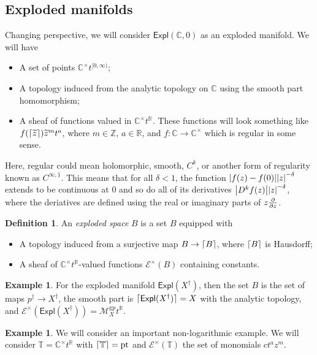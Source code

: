 \documentclass[leqno, openany]{memoir}
\DeclarePairedDelimiter{\ceil}{\lceil}{\rceil}
\theoremstyle{definition}
\newtheorem{defn}[thm]{Definition}
\newtheorem{exm}[thm]{Example}
\theoremstyle{remark}
\theoremstyle{plain}
\theoremstyle{definition}
\theoremstyle{remark}
\newcommand{\R}{\mathbb{R}}
\newcommand{\C}{\mathbb{C}}
\newcommand{\Z}{\mathbb{Z}}
\newcommand{\mc}[1]{\mathcal{#1}}
\newcommand{\mr}[1]{\mathrm{#1}}
\newcommand{\ms}[1]{\mathsf{#1}}
\newcommand{\ul}[1]{\underline{#1}}
\newcommand{\wt}[1]{\widetilde{#1}}
\begin{document}
\subsection{Exploded manifolds}
\label{subsec:exploded_mflds}

Changing perspective, we will consider $\ms{Expl}(\C, 0)$ as an exploded manifold. We will have
\begin{itemize}
\item A set of points $\C^{\times}t^{[0, \infty)}$;
\item A topology induced from the analytic topology on $\C$ using the smooth part homomorphism;
\item A sheaf of functions valued in $\C^{\times}t^{\R}$. These functions will look something like $f(\ceil{\wt{z}}) \wt{z}^m t^a$, where $m \in \Z$, $a \in \R$, and $f \colon \C \to \C^{\times}$ which is regular in some sense.
\end{itemize}

Here, regular could mean holomorphic, smooth, $C^k$, or another form of regularity known as $C^{\infty, \ul{1}}$. This means that for all $\delta < 1$, the function $\abs{f(z) - f(0)} \abs{z}^{-\delta}$ extends to be continuous at $0$ and so do all of its derivatives $\abs{D^kf(z)} \abs{z}^{-\delta}$, where the deriatives are defined using the real or imaginary parts of $z \pdv{z}$.

\begin{defn}
  An \textit{exploded space} $B$ is a set $B$ equipped with
  \begin{itemize}
  \item A topology induced from a surjective map $B \to \ceil{B}$, where $\ceil{B}$ is Hausdorff;
  \item A sheaf of $\C^{\times} t^{\R}$-valued functions $\mc{E}^{\times}(B)$ containing constants.
  \end{itemize}
\end{defn}

\begin{exm}
For the exploded manifold $\ms{Expl}(X^{\dag})$, then the set $B$ is the set of maps $p^{\dag} \to X^{\dag}$, the smooth part is $\ceil{\ms{Expl}(X^{\dag})} = X$ with the analytic topology, and $\mc{E}^{\times}(\ms{Expl}(X^{\dag})) = \mc{M}_X^{\mr{gp}} t^{\R}$.
\end{exm}

\begin{exm}
We will consider an important non-logarithmic example. We will consider $\mathbb{T} = \C^{\times}t^{\R}$ with $\ceil{\mathbb{T}} = \mr{pt}$ and $\mc{E}^{\times}(\mathbb{T})$ the set of monomials $ct^az^m$.
\end{exm}
\end{document}
